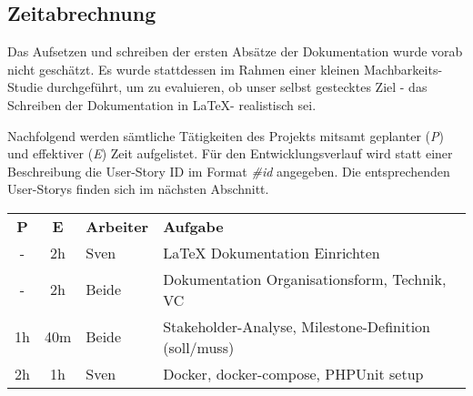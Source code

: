 \subsection{Zeitabrechnung}
Das Aufsetzen und schreiben der ersten Absätze der Dokumentation wurde vorab nicht geschätzt. Es wurde stattdessen im Rahmen einer kleinen Machbarkeits-Studie durchgeführt, um zu evaluieren, ob unser selbst gestecktes Ziel - das Schreiben der Dokumentation in \LaTeX - realistisch sei.

Nachfolgend werden sämtliche Tätigkeiten des Projekts mitsamt geplanter (\emph{P}) und effektiver (\emph{E}) Zeit aufgelistet. Für den Entwicklungsverlauf wird statt einer Beschreibung die User-Story ID im Format \emph{\#id} angegeben. Die entsprechenden User-Storys finden sich im nächsten Abschnitt.

\vspace{5mm}

\begin{tabular}{ c c l l }
  \textbf{P} & \textbf{E} & \textbf{Arbeiter} & \textbf{Aufgabe} \\
  - & 2h & Sven & LaTeX Dokumentation Einrichten \\
  - & 2h & Beide & Dokumentation Organisationsform, Technik, VC\\
  1h & 40m & Beide & Stakeholder-Analyse, Milestone-Definition (soll/muss) \\
  2h & 1h & Sven & Docker, docker-compose, PHPUnit setup \\
\end{tabular}
